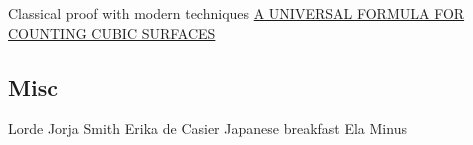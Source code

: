 \documentclass[11pt]{article}
\begin{document}
Classical proof with modern techniques
\href{A UNIVERSAL FORMULA FOR COUNTING CUBIC SURFACES.pdf}{A UNIVERSAL FORMULA FOR COUNTING CUBIC SURFACES}



























































\subsection{Misc}
\label{sec:orgec2e0a1}

Lorde
Jorja Smith
Erika de Casier
Japanese breakfast
Ela Minus
\end{document}
